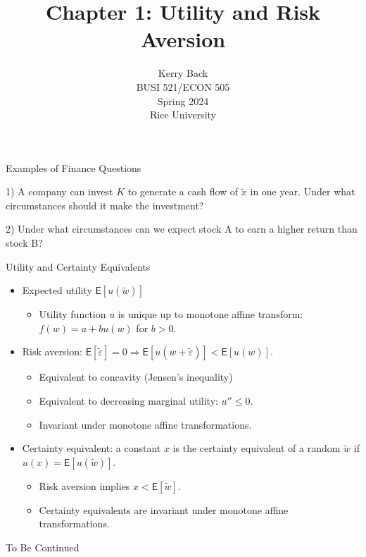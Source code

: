 \documentclass[10pt]{beamer}
\title{Chapter 1: Utility and Risk Aversion}
\date{}
\author{Kerry Back\\ 
BUSI 521/ECON 505\\
Spring 2024\\
Rice University}
\newcommand{\mye}{\mathsf{E}}
\newcommand{\bi}{\begin{itemize}}
\newcommand{\ei}{\end{itemize}}
\newcommand{\im}{\item}
\newcommand{\mye}{\ensuremath{\mathsf{E}}}
\begin{document}
\maketitle

\begin{frame}{Examples of Finance Questions}


1) A company can invest $K$ to generate a cash flow of $\tilde{x}$ in one year.  Under what circumstances should it make the investment?

\vskip 1in

2) Under what circumstances can we expect stock A to earn a higher return than stock B?

\end{frame}

\begin{frame}{Utility and Certainty Equivalents}
\bi
\im Expected utility $\mye[u(\tilde{w})]$
\bi
\im Utility function $u$ is unique up to monotone affine transform: $f(w) = a+b u(w)$ for $b>0$.
\ei
\im Risk aversion: $\mye[\tilde{\varepsilon}]=0 \Rightarrow \mye[u(w+\tilde{\varepsilon})] < \mye[u(w)]$.
\bi
\im Equivalent to concavity (Jensen's inequality)
\im Equivalent to decreasing marginal utility: $u'' \leq 0$.
\im Invariant under monotone affine transformations.
\ei
\im Certainty equivalent: a constant $x$ is the certainty equivalent of a random $\tilde{w}$ if $u(x) = \mye[u(\tilde{w})]$.  
\bi
\im Risk aversion implies $x<\mye[\tilde{w}]$.
\im Certainty equivalents are invariant under monotone affine transformations.
\ei
\ei
\end{frame}

\begin{frame}[plain]
  \Large To Be Continued
\end{frame}
\end{document}
